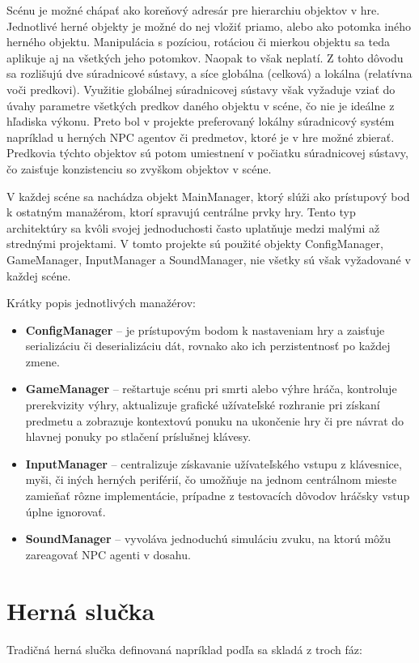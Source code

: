 \documentclass[slovak, master]{diploma}
\begin{document}
Scénu je možné chápať ako koreňový adresár pre hierarchiu objektov v hre. Jednotlivé herné objekty je možné do nej vložiť priamo, alebo ako potomka iného herného objektu. Manipulácia s pozíciou, rotáciou či mierkou objektu sa teda aplikuje aj na všetkých jeho potomkov. Naopak to však neplatí. Z tohto dôvodu sa rozlišujú dve súradnicové sústavy, a síce globálna (celková) a lokálna (relatívna voči predkovi). Využitie globálnej súradnicovej sústavy však vyžaduje vziať do úvahy parametre všetkých predkov daného objektu v scéne, čo nie je ideálne z hľadiska výkonu. Preto bol v projekte preferovaný lokálny súradnicový systém napríklad u herných NPC agentov či predmetov, ktoré je v hre možné zbierať. Predkovia týchto objektov sú potom umiestnení v počiatku súradnicovej sústavy, čo zaisťuje konzistenciu so zvyškom objektov v scéne.

V každej scéne sa nachádza objekt MainManager, ktorý slúži ako prístupový bod k ostatným manažérom, ktorí spravujú centrálne prvky hry. Tento typ architektúry sa kvôli svojej jednoduchosti často uplatňuje medzi malými až strednými projektami. V tomto projekte sú použité objekty ConfigManager, GameManager, InputManager a SoundManager, nie všetky sú však vyžadované v každej scéne. 

Krátky popis jednotlivých manažérov:
\begin{itemize}
  \item \textbf{ConfigManager} -- je prístupovým bodom k nastaveniam hry a zaisťuje serializáciu či deserializáciu dát, rovnako ako ich perzistentnosť po každej zmene.
  \item \textbf{GameManager} -- reštartuje scénu pri smrti alebo výhre hráča, kontroluje prerekvizity výhry, aktualizuje grafické užívateľské rozhranie pri získaní predmetu a zobrazuje kontextovú ponuku na ukončenie hry či pre návrat do hlavnej ponuky po stlačení príslušnej klávesy.
  \item \textbf{InputManager} -- centralizuje získavanie užívateľského vstupu z klávesnice, myši, či iných herných periférií, čo umožňuje na jednom centrálnom mieste zamieňať rôzne implementácie, prípadne z testovacích dôvodov hráčsky vstup úplne ignorovať. 
  \item \textbf{SoundManager} -- vyvoláva jednoduchú simuláciu zvuku, na ktorú môžu zareagovať NPC agenti v dosahu.
\end{itemize}

\section{Herná slučka}
\label{sec:GameLoop}
Tradičná herná slučka definovaná napríklad podľa \cite{GameAlgorithms} sa skladá z troch fáz:
\end{document}
